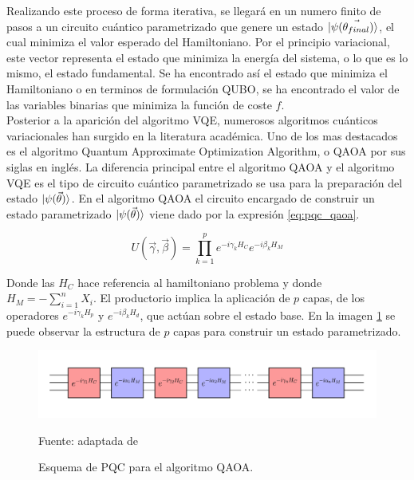 \newpage

Realizando este proceso de forma iterativa, se llegará en un numero finito de pasos a un circuito cuántico parametrizado que genere un estado $\ket{\psi(\Vec{\theta_{final}})}$, el cual minimiza el valor esperado del Hamiltoniano. Por el principio variacional, este vector representa el estado que minimiza la energía del sistema, o lo que es lo mismo, el estado fundamental. Se ha encontrado así el estado que minimiza el Hamiltoniano o en terminos de formulación QUBO, se ha encontrado el valor de las variables binarias que minimiza la función de coste $f$. \\

Posterior a la aparición del algoritmo VQE, numerosos algoritmos cuánticos variacionales han surgido en la literatura académica. Uno de los mas destacados es el algoritmo Quantum Approximate Optimization Algorithm, o QAOA \citep{farhi} por sus siglas en inglés. La diferencia principal entre el algoritmo QAOA y el algoritmo VQE es el tipo de circuito cuántico parametrizado se usa para la preparación del estado  $\ket{\psi(\Vec{\theta})}$. En el algoritmo QAOA el circuito encargado de construir un estado parametrizado $\ket{\psi(\Vec{\theta})}$ viene dado por la expresión \ref{eq:pqc_qaoa}.


\begin{equation}
    U(\vec \gamma,\vec \beta)=\prod_{k=1}^p e^{-i \gamma_k H_C} e^{- i \beta_k H_M}
    \label{eq:pqc_qaoa}
\end{equation}

Donde las $H_C$ hace referencia al hamiltoniano problema y donde $H_M=-\sum_{i=1}^n X_i$. El productorio implica la aplicación de $p$ capas, de los operadores $e^{-i \gamma_k H_p}$ y $e^{- i \beta_k H_d}$, que actúan sobre el estado base. En la imagen \ref{fig:qaoa_layers} se puede observar la estructura de $p$ capas para construir un estado parametrizado.

\begin{figure}[!ht]
    \centering
    \includegraphics[scale = 0.4]{img/03-qaoa_layers.png}
    \caption{Esquema de PQC para el algoritmo QAOA.}
    Fuente: adaptada de \citep{jack}
    \label{fig:qaoa_layers}
\end{figure}

